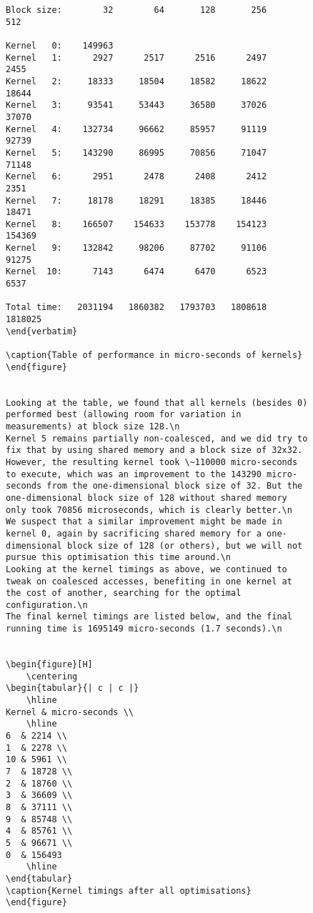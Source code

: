 \begin{figure}[H]
    \centering
\begin{Verbatim}
Block size:        32        64       128       256       512

Kernel   0:    149963
Kernel   1:      2927      2517      2516      2497      2455
Kernel   2:     18333     18504     18582     18622     18644
Kernel   3:     93541     53443     36580     37026     37070
Kernel   4:    132734     96662     85957     91119     92739
Kernel   5:    143290     86995     70856     71047     71148
Kernel   6:      2951      2478      2408      2412      2351
Kernel   7:     18178     18291     18385     18446     18471
Kernel   8:    166507    154633    153778    154123    154369
Kernel   9:    132842     98206     87702     91106     91275
Kernel  10:      7143      6474      6470      6523      6537

Total time:   2031194   1860382   1793703   1808618   1818025
\end{verbatim}

\caption{Table of performance in micro-seconds of kernels}
\end{figure}


Looking at the table, we found that all kernels (besides 0) performed best (allowing room for variation in measurements) at block size 128.\n
Kernel 5 remains partially non-coalesced, and we did try to fix that by using shared memory and a block size of 32x32. However, the resulting kernel took \~110000 micro-seconds to execute, which was an improvement to the 143290 micro-seconds from the one-dimensional block size of 32. But the one-dimensional block size of 128 without shared memory only took 70856 microseconds, which is clearly better.\n
We suspect that a similar improvement might be made in kernel 0, again by sacrificing shared memory for a one-dimensional block size of 128 (or others), but we will not pursue this optimisation this time around.\n
Looking at the kernel timings as above, we continued to tweak on coalesced accesses, benefiting in one kernel at the cost of another, searching for the optimal configuration.\n
The final kernel timings are listed below, and the final running time is 1695149 micro-seconds (1.7 seconds).\n


\begin{figure}[H]
    \centering
\begin{tabular}{| c | c |}
    \hline
Kernel & micro-seconds \\
    \hline
6  & 2214 \\
1  & 2278 \\
10 & 5961 \\
7  & 18728 \\
2  & 18760 \\
3  & 36609 \\
8  & 37111 \\
9  & 85748 \\
4  & 85761 \\
5  & 96671 \\
0  & 156493
    \hline
\end{tabular}
\caption{Kernel timings after all optimisations}
\end{figure}


\end{Verbatim}
\end{figure}
